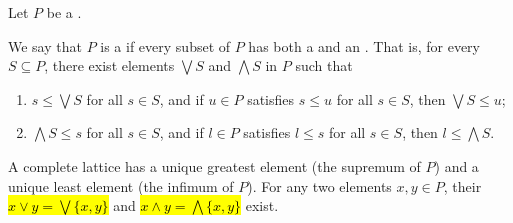 \begin{definition} \label{definition:complete_lattice_as_a_partially_ordered_set}
Let $P$ be a .

We say that $P$ is a  if every subset of $P$ has both a  and an . That is, for every $S \subseteq P$, there exist elements $\bigvee S$ and $\bigwedge S$ in $P$ such that
\begin{enumerate}
    \item $s \leq \bigvee S$ for all $s \in S$, and if $u \in P$ satisfies $s \leq u$ for all $s \in S$, then $\bigvee S \leq u$;
    \item $\bigwedge S \leq s$ for all $s \in S$, and if $l \in P$ satisfies $l \leq s$ for all $s \in S$, then $l \leq \bigwedge S$.
\end{enumerate}

A complete lattice has a unique greatest element (the supremum of $P$) and a unique least element (the infimum of $P$). For any two elements $x, y \in P$, their  \hl{$x \vee y = \bigvee \{x, y\}$} and  \hl{$x \wedge y = \bigwedge \{x, y\}$} exist.
\end{definition}
